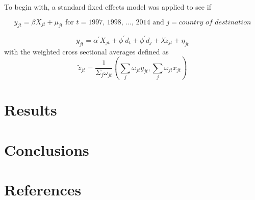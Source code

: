 \documentclass[]{article}
\begin{document}
To begin with, a standard fixed effects model was applied to see if

\[ y_{jt} = \beta X_{jt} + \mu_{jt} \text{ for } t = \text{1997, 1998, ...,  2014} \text{ and } j =  \textit{country of destination} \]

\[y_{jt} = \alpha ^{\prime}X_{jt} + \phi ^{\prime} d_t  + \phi ^{\prime} d_j + \lambda \tilde{z}_{jt} + \eta_{jt}\]
with the weighted cross sectional averages defined as
\[\tilde{z}_{jt}= \frac{1}{\Sigma_j \omega_{jt}}(\sum_{j}\omega_{jt}y_{jt}, \sum_{j}\omega_{jt}x_{jt})\]

\section{Results}\label{results}

\section{Conclusions}\label{conclusions}

\section{References}\label{references}
\end{document}

